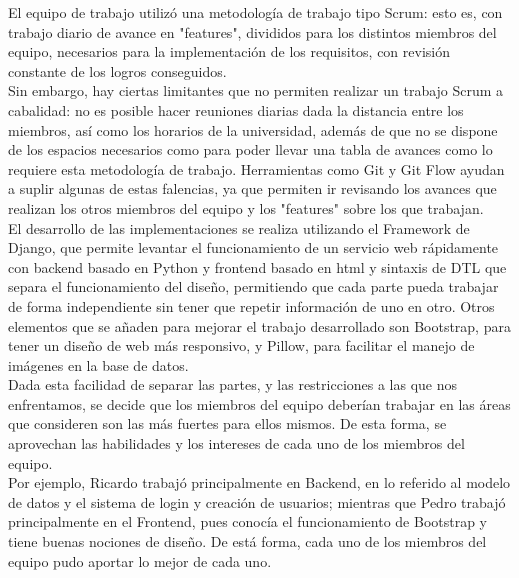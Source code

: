 El equipo de trabajo utilizó una metodología de trabajo tipo Scrum: esto es, con trabajo diario de avance en "features", divididos para los distintos miembros del equipo, necesarios para la implementación de los requisitos, con revisión constante de los logros conseguidos. \\
Sin embargo, hay ciertas limitantes que no permiten realizar un trabajo Scrum a cabalidad: no es posible hacer reuniones diarias dada la distancia entre los miembros, así como los horarios de la universidad, además de que no se dispone de los espacios necesarios como para poder llevar una tabla de avances como lo requiere esta metodología de trabajo. Herramientas como Git y Git Flow ayudan a suplir algunas de estas falencias, ya que permiten ir revisando los avances que realizan los otros miembros del equipo y los "features" sobre los que trabajan.\\
El desarrollo de las implementaciones se realiza utilizando el Framework de Django, que permite levantar el funcionamiento de un servicio web rápidamente con backend basado en Python y frontend basado en html y sintaxis de DTL que separa el funcionamiento del diseño, permitiendo que cada parte pueda trabajar de forma independiente sin tener que repetir información de uno en otro. Otros elementos que se añaden para mejorar el trabajo desarrollado son Bootstrap, para tener un diseño de web más responsivo, y Pillow, para facilitar el manejo de imágenes en la base de datos. \\
Dada esta facilidad de separar las partes, y las restricciones a las que nos enfrentamos, se decide que los miembros del equipo deberían trabajar en las áreas que consideren son las más fuertes para ellos mismos. De esta forma, se aprovechan las habilidades y los intereses de cada uno de los miembros del equipo. \\
Por ejemplo, Ricardo trabajó principalmente en Backend, en lo referido al modelo de datos y el sistema de login y creación de usuarios; mientras que Pedro trabajó principalmente en el Frontend, pues conocía el funcionamiento de Bootstrap y tiene buenas nociones de diseño. De está forma, cada uno de los miembros del equipo pudo aportar lo mejor de cada uno. \\


